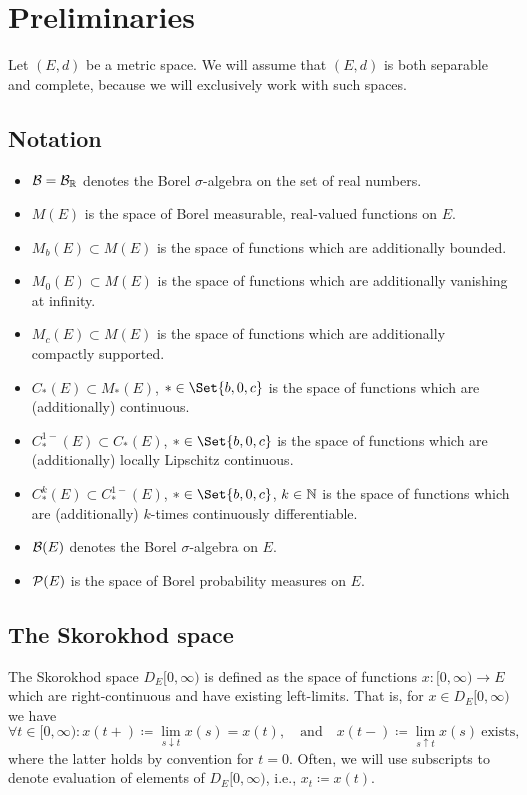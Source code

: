 \section{Preliminaries}

Let \((E,d)\) be a metric space.
We will assume that \((E,d)\) is both separable and complete, because we will exclusively work with such spaces.

\subsection{Notation}
\begin{itemize}
  \item \( \mathcal{B} = \mathcal{B}_{\mathbb{R}} \) denotes the Borel \( \sigma \)-algebra on the set of real numbers.
  \item \(M(E)\) is the space of Borel measurable, real-valued functions on \(E\).
  \item \(M_b(E) \subset M(E)\) is the space of functions which are additionally bounded.
  \item \(M_0(E) \subset M(E)\) is the space of functions which are additionally vanishing at infinity.
  \item \(M_c(E) \subset M(E)\) is the space of functions which are additionally compactly supported.
  \item \(C_*(E) \subset M_*(E)\), \( * \in \Set{b, 0, c} \) is the space of functions which are (additionally) continuous.
  \item \(C_*^{1-}(E) \subset C_*(E)\), \( * \in \Set{b, 0, c} \) is the space of functions which are (additionally) locally Lipschitz continuous.
  \item \(C_*^{k}(E) \subset C_*^{1-}(E)\), \( * \in \Set{b, 0, c} \), \( k \in \mathbb{N} \) is the space of functions which are (additionally) \(k\)-times continuously differentiable.
  \item \(\mathcal{B}(E)\) denotes the Borel \( \sigma \)-algebra on \(E\).
  \item \(\mathcal{P}(E)\) is the space of Borel probability measures on \(E\).
\end{itemize}

\subsection{The Skorokhod space}%
The Skorokhod space \(D_E[0,\infty)\) is defined as the space of functions \(x : [0,\infty) \to E\) which are right-continuous and have existing left-limits.
That is, for \(x \in D_E[0,\infty)\) we have
\begin{equation}
  \forall t \in [0,\infty) : x(t+) \coloneqq \lim_{s \downarrow t} x(s) = x(t), \quad\text{and}\quad x(t-) \coloneqq \lim_{s \uparrow t} x(s)\ \text{exists},
\end{equation}
where the latter holds by convention for \(t = 0\).
Often, we will use subscripts to denote evaluation of elements of \(D_E[0,\infty)\), i.e., \(x_t \coloneqq x(t)\).

